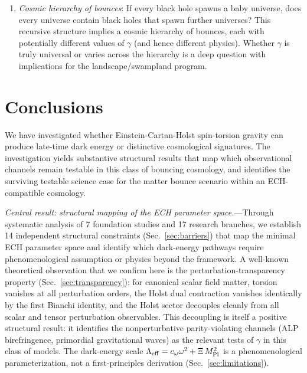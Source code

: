 \documentclass[aps,prd,twocolumn,superscriptaddress,showpacs,preprintnumbers,nofootinbib,longbibliography,floatfix]{revtex4-2}
\newcommand{\Leff}{\Lambda_{\rm eff}}
\newcommand{\MPl}{M_{\rm Pl}}
\begin{document}
\begin{enumerate}[leftmargin=*]
\item \textit{Cosmic hierarchy of bounces}: If every black hole spawns a baby universe, does every universe contain black holes that spawn further universes? This recursive structure implies a cosmic hierarchy of bounces, each with potentially different values of $\gamma$ (and hence different physics). Whether $\gamma$ is truly universal or varies across the hierarchy is a deep question with implications for the landscape/swampland program.
\end{enumerate}


\section{Conclusions}\label{sec:conclusions}

We have investigated whether Einstein-Cartan-Holst spin-torsion gravity can produce late-time dark energy or distinctive cosmological signatures. The investigation yields substantive structural results that map which observational channels remain testable in this class of bouncing cosmology, and identifies the surviving testable science case for the matter bounce scenario within an ECH-compatible cosmology.

\textit{Central result: structural mapping of the ECH parameter space.}---Through systematic analysis of 7 foundation studies and 17 research branches, we establish 14 independent structural constraints (Sec.~\ref{sec:barriers}) that map the minimal ECH parameter space and identify which dark-energy pathways require phenomenological assumption or physics beyond the framework. A well-known theoretical observation that we confirm here is the perturbation-transparency property (Sec.~\ref{sec:transparency}): for canonical scalar field matter, torsion vanishes at all perturbation orders, the Holst dual contraction vanishes identically by the first Bianchi identity, and the Holst sector decouples cleanly from all scalar and tensor perturbation observables. This decoupling is itself a positive structural result: it identifies the nonperturbative parity-violating channels (ALP birefringence, primordial gravitational waves) as the relevant tests of $\gamma$ in this class of models. The dark-energy scale $\Leff = c_\omega\omega^2+\Xi\,\MPl^2$ is a phenomenological parameterization, not a first-principles derivation (Sec.~\ref{sec:limitations}).
\end{document}
